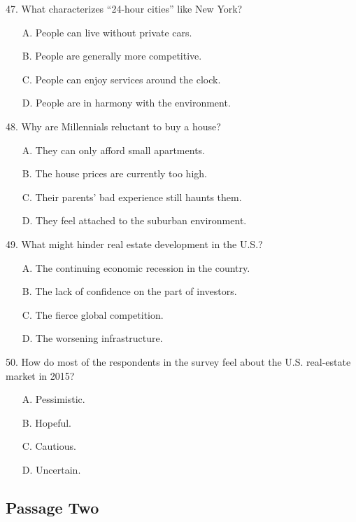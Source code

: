 \documentclass[UTF8,11pt]{ctexart}
\begin{document}
47. What characterizes “24-hour cities” like New York?


\begin{itemize}[leftmargin=2em,itemsep=.2em,topsep=.4em]\item[A.] People can live without private cars.
\item[B.] People are generally more competitive.
\item[C.] People can enjoy services around the clock.
\item[D.] People are in harmony with the environment.
\end{itemize}

48. Why are Millennials reluctant to buy a house?


\begin{itemize}[leftmargin=2em,itemsep=.2em,topsep=.4em]\item[A.] They can only afford small apartments.
\item[B.] The house prices are currently too high.
\item[C.] Their parents' bad experience still haunts them.
\item[D.] They feel attached to the suburban environment.
\end{itemize}

49. What might hinder real estate development in the U.S.?


\begin{itemize}[leftmargin=2em,itemsep=.2em,topsep=.4em]\item[A.] The continuing economic recession in the country.
\item[B.] The lack of confidence on the part of investors.
\item[C.] The fierce global competition.
\item[D.] The worsening infrastructure.
\end{itemize}

50. How do most of the respondents in the survey feel about the U.S. real-estate market in 2015?


\begin{itemize}[leftmargin=2em,itemsep=.2em,topsep=.4em]\item[A.] Pessimistic.
\item[B.] Hopeful.
\item[C.] Cautious.
\item[D.] Uncertain.
\end{itemize}

\subsection*{\textbf{Passage Two}}
\end{document}
